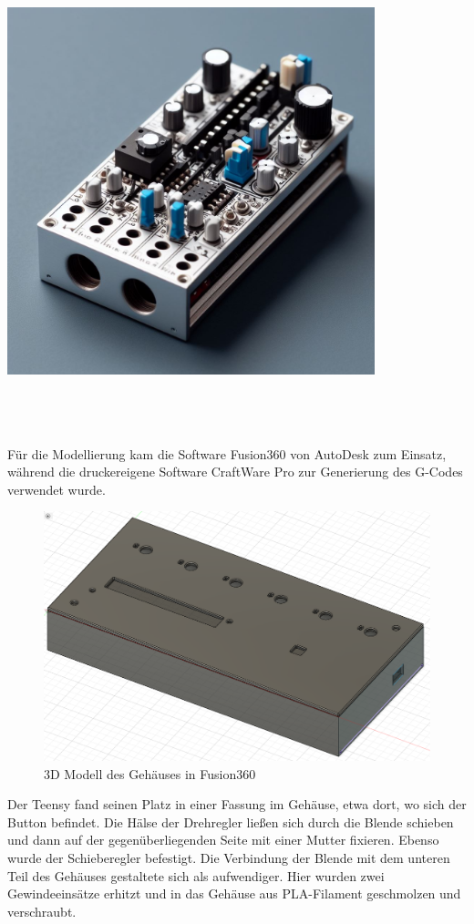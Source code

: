 \documentclass[12pt]{scrartcl}%
\theoremstyle{nonumberplain}
\begin{document}
\begin{minipage}[t]{0.5\textwidth}
\centering
\includegraphics[width=0.8\textwidth]{hw_0}
\end{minipage}\\
\\\\
Für die Modellierung kam die Software Fusion360 von AutoDesk zum Einsatz, während die druckereigene Software CraftWare Pro zur Generierung des G-Codes verwendet wurde.\\
\begin{figure}[h]
\centering
  \includegraphics[scale=0.25]{hw_2}
  \caption{3D Modell des Gehäuses in Fusion360}
\end{figure}
\newpage
\noindent Der Teensy fand seinen Platz in einer Fassung im Gehäuse, etwa dort, wo sich der Button befindet. Die Hälse der Drehregler ließen sich durch die Blende schieben und dann auf der gegenüberliegenden Seite mit einer Mutter fixieren. Ebenso wurde der Schieberegler befestigt. Die Verbindung der Blende mit dem unteren Teil des Gehäuses gestaltete sich als aufwendiger. Hier wurden zwei Gewindeeinsätze erhitzt und in das Gehäuse aus PLA-Filament geschmolzen und verschraubt.\\
\end{document}
